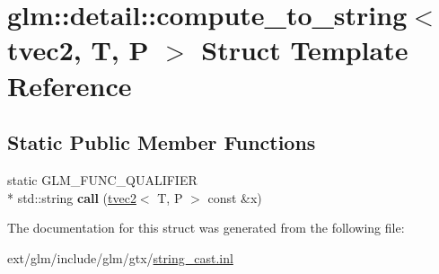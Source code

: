 \hypertarget{structglm_1_1detail_1_1compute__to__string_3_01tvec2_00_01_t_00_01_p_01_4}{\section{glm\-:\-:detail\-:\-:compute\-\_\-to\-\_\-string$<$ tvec2, T, P $>$ Struct Template Reference}
\label{structglm_1_1detail_1_1compute__to__string_3_01tvec2_00_01_t_00_01_p_01_4}
}
\subsection*{Static Public Member Functions}
\begin{DoxyCompactItemize}
\item 
\hypertarget{structglm_1_1detail_1_1compute__to__string_3_01tvec2_00_01_t_00_01_p_01_4_adf2e2875ee41bafdadd331fe4760e435}{static G\-L\-M\-\_\-\-F\-U\-N\-C\-\_\-\-Q\-U\-A\-L\-I\-F\-I\-E\-R \\*
std\-::string {\bfseries call} (\hyperlink{structglm_1_1tvec2}{tvec2}$<$ T, P $>$ const \&x)}\label{structglm_1_1detail_1_1compute__to__string_3_01tvec2_00_01_t_00_01_p_01_4_adf2e2875ee41bafdadd331fe4760e435}

\end{DoxyCompactItemize}


The documentation for this struct was generated from the following file\-:\begin{DoxyCompactItemize}
\item 
ext/glm/include/glm/gtx/\hyperlink{string__cast_8inl}{string\-\_\-cast.\-inl}\end{DoxyCompactItemize}
